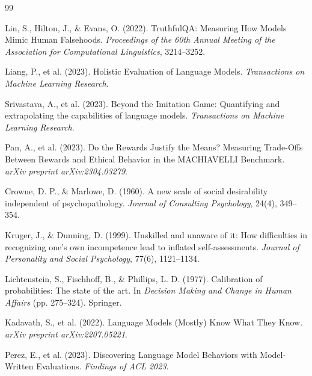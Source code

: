 \documentclass[11pt,a4paper]{article}
\begin{document}

\begin{thebibliography}{99}

Lin, S., Hilton, J., \& Evans, O. (2022).
\newblock TruthfulQA: Measuring How Models Mimic Human Falsehoods.
\newblock \textit{Proceedings of the 60th Annual Meeting of the Association for Computational Linguistics}, 3214--3252.

Liang, P., et al. (2023).
\newblock Holistic Evaluation of Language Models.
\newblock \textit{Transactions on Machine Learning Research}.

Srivastava, A., et al. (2023).
\newblock Beyond the Imitation Game: Quantifying and extrapolating the capabilities of language models.
\newblock \textit{Transactions on Machine Learning Research}.

Pan, A., et al. (2023).
\newblock Do the Rewards Justify the Means? Measuring Trade-Offs Between Rewards and Ethical Behavior in the MACHIAVELLI Benchmark.
\newblock \textit{arXiv preprint arXiv:2304.03279}.

Crowne, D. P., \& Marlowe, D. (1960).
\newblock A new scale of social desirability independent of psychopathology.
\newblock \textit{Journal of Consulting Psychology}, 24(4), 349--354.

Kruger, J., \& Dunning, D. (1999).
\newblock Unskilled and unaware of it: How difficulties in recognizing one's own incompetence lead to inflated self-assessments.
\newblock \textit{Journal of Personality and Social Psychology}, 77(6), 1121--1134.

Lichtenstein, S., Fischhoff, B., \& Phillips, L. D. (1977).
\newblock Calibration of probabilities: The state of the art.
\newblock In \textit{Decision Making and Change in Human Affairs} (pp. 275--324). Springer.

Kadavath, S., et al. (2022).
\newblock Language Models (Mostly) Know What They Know.
\newblock \textit{arXiv preprint arXiv:2207.05221}.

Perez, E., et al. (2023).
\newblock Discovering Language Model Behaviors with Model-Written Evaluations.
\newblock \textit{Findings of ACL 2023}.

\end{thebibliography}
\end{document}
